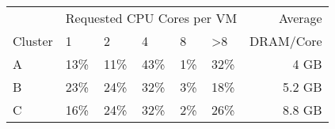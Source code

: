 \newcommand{\ctlen}{.3cm}


\begin{table}[t!]
\begin{center}
\small
\centering
\begin{tabular}{l|p{\ctlen}p{\ctlen}p{\ctlen}p{\ctlen}p{\ctlen}|r}
& \multicolumn{5}{c|}{Requested CPU Cores per VM}           & {Average} \\
Cluster & 1    & 2    & 4    & 8   & \textgreater{}8 & DRAM/Core \\
\hline
A & 13\% & 11\% & 43\% & 1\% & 32\% & 4 GB     \\
B & 23\% & 24\% & 32\% & 3\% & 18\% & 5.2 GB   \\
C & 16\% & 24\% & 32\% & 2\% & 26\% & 8.8 GB
\end{tabular}
%
\end{center}
\vspace{-.1in}
\vminten
%
%
\vminten
%
\end{table}

